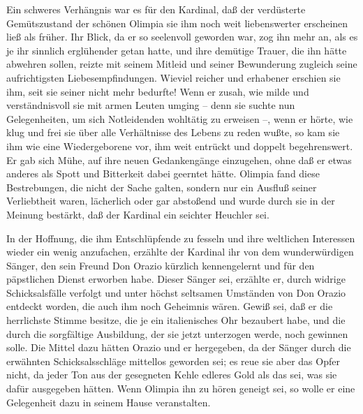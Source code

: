 Ein schweres Verhängnis war es für den Kardinal, daß der
verdüsterte Gemütszustand der schönen Olimpia sie ihm noch weit
liebenswerter erscheinen ließ als früher. Ihr Blick, da er so
seelenvoll geworden war, zog ihn mehr an, als es je ihr sinnlich
erglühender getan hatte, und ihre demütige Trauer, die ihn hätte
abwehren sollen, reizte mit seinem Mitleid und seiner Bewunderung
zugleich seine aufrichtigsten Liebesempfindungen. Wieviel reicher
und erhabener erschien sie ihm, seit sie seiner nicht mehr
bedurfte! Wenn er zusah, wie milde und verständnisvoll sie mit
armen Leuten umging – denn sie suchte nun Gelegenheiten, um sich
Notleidenden wohltätig zu erweisen –, wenn er hörte, wie klug und
frei sie über alle Verhältnisse des Lebens zu reden wußte, so kam
sie ihm wie eine Wiedergeborene vor, ihm weit entrückt und doppelt
begehrenswert. Er gab sich Mühe, auf ihre neuen Gedankengänge
einzugehen, ohne daß er etwas anderes als Spott und Bitterkeit
dabei \pagenum{[82]} geerntet hätte. Olimpia fand diese
Bestrebungen, die nicht der Sache galten, sondern nur ein Ausfluß
seiner Verliebtheit waren, lächerlich oder gar abstoßend und wurde
durch sie in der Meinung bestärkt, daß der Kardinal ein seichter
Heuchler sei.

In der Hoffnung, die ihm Entschlüpfende zu fesseln und ihre
weltlichen Interessen wieder ein wenig anzufachen, erzählte der
Kardinal ihr von dem wunderwürdigen Sänger, den sein Freund Don
Orazio kürzlich kennengelernt und für den päpstlichen Dienst
erworben habe. Dieser Sänger sei, erzählte er, durch widrige
Schicksalsfälle verfolgt und unter höchst seltsamen Umständen von
Don Orazio entdeckt worden, die auch ihm noch Geheimnis wären.
Gewiß sei, daß er die herrlichste Stimme besitze, die je ein
italienisches Ohr bezaubert habe, und die durch die sorgfältige
Ausbildung, der sie jetzt unterzogen werde, noch gewinnen solle.
Die Mittel dazu hätten Orazio und er hergegeben, da der Sänger
durch die erwähnten Schicksalsschläge mittellos geworden sei; es
reue sie aber das Opfer nicht, da jeder Ton aus der gesegneten
Kehle edleres Gold als das sei, was sie dafür ausgegeben hätten.
Wenn Olimpia ihn zu hören geneigt sei, so wolle er eine Gelegenheit
dazu in seinem Hause veranstalten.

